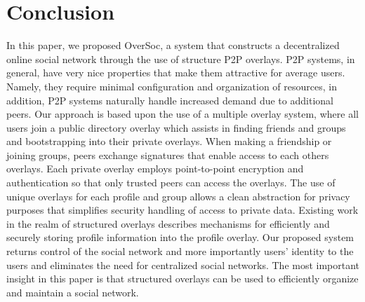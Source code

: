 \documentclass{IEEEtran}
\begin{document}
\section{Conclusion}
\label{conclusion}

In this paper, we proposed OverSoc, a system that constructs a decentralized
online social network through the use of structure P2P overlays.  P2P systems,
in general, have very nice properties that make them attractive for average
users.  Namely, they require minimal configuration and organization of
resources, in addition, P2P systems naturally handle increased demand due to
additional peers.  Our approach is based upon the use of a multiple overlay
system, where all users join a public directory overlay which assists in
finding friends and groups and bootstrapping into their private overlays.  When
making a friendship or joining groups, peers exchange signatures that enable
access to each others overlays.  Each private overlay employs point-to-point
encryption and authentication so that only trusted peers can access the
overlays.  The use of unique overlays for each profile and group allows a clean
abstraction for privacy purposes that simplifies security handling of access to
private data.  Existing work in the realm of structured overlays describes
mechanisms for efficiently and securely storing profile information into the
profile overlay.  Our proposed system returns control of the social network and
more importantly users' identity to the users and eliminates the need for
centralized social networks.  The most important insight in this paper is that
structured overlays can be used to efficiently organize and maintain a social
network.\\



\end{document}
